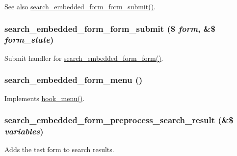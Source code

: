 \begin{DoxySeeAlso}{See also}
\hyperlink{search__embedded__form_8module_a4ac1f14b46e498aa189d6fa37ef07bb6}{search\_\-embedded\_\-form\_\-form\_\-submit()}. 
\end{DoxySeeAlso}
\hypertarget{search__embedded__form_8module_a4ac1f14b46e498aa189d6fa37ef07bb6}{
\subsubsection[{search\_\-embedded\_\-form\_\-form\_\-submit}]{\setlength{\rightskip}{0pt plus 5cm}search\_\-embedded\_\-form\_\-form\_\-submit (\$ {\em form}, \/  \&\$ {\em form\_\-state})}}
\label{search__embedded__form_8module_a4ac1f14b46e498aa189d6fa37ef07bb6}
Submit handler for \hyperlink{search__embedded__form_8module_a5159e0d5e6569031ea180af578e844ff}{search\_\-embedded\_\-form\_\-form()}. \hypertarget{search__embedded__form_8module_ae274584aa14bbc0cb6f3364537945562}{
\subsubsection[{search\_\-embedded\_\-form\_\-menu}]{\setlength{\rightskip}{0pt plus 5cm}search\_\-embedded\_\-form\_\-menu ()}}
\label{search__embedded__form_8module_ae274584aa14bbc0cb6f3364537945562}
Implements \hyperlink{group__hooks_ga5c95244fea59b25666e409759e133ded}{hook\_\-menu()}. \hypertarget{search__embedded__form_8module_a45bd8ca2767b0b47d790515c38383713}{
\subsubsection[{search\_\-embedded\_\-form\_\-preprocess\_\-search\_\-result}]{\setlength{\rightskip}{0pt plus 5cm}search\_\-embedded\_\-form\_\-preprocess\_\-search\_\-result (\&\$ {\em variables})}}
\label{search__embedded__form_8module_a45bd8ca2767b0b47d790515c38383713}
Adds the test form to search results. 